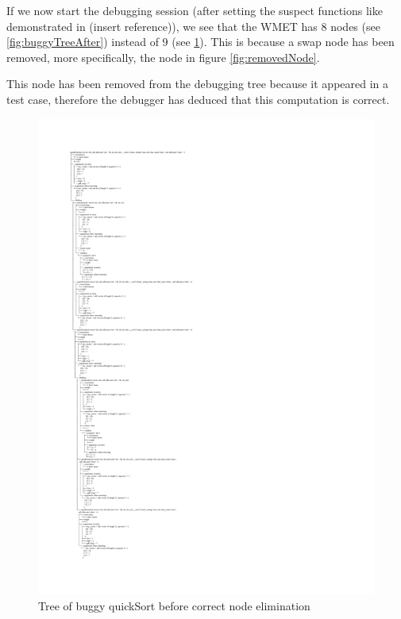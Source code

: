 If we now start the debugging session (after setting the suspect functions like demonstrated in (insert reference)), we see that the WMET has 8 nodes (see \ref{fig:buggyTreeAfter}) instead of 9 (see \ref{fig:buggyTreeBefore}). This is because a swap node has been removed, more specifically, the node in figure \ref{fig:removedNode}.

This node has been removed from the debugging tree because it appeared in a test case, therefore the debugger has deduced that this computation is correct.

\begin{figure}[p]
\centering
    \caption{Tree of buggy quickSort before correct node elimination}
    \label{fig:buggyTreeBefore}
\includegraphics[width=\textwidth,height=\textheight,keepaspectratio]{Imagenes/Vectorial/buggy.pdf}
\end{figure}

